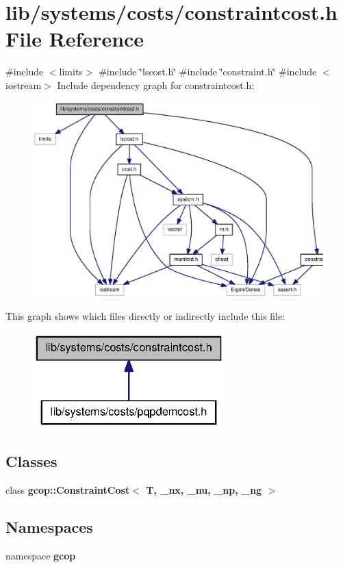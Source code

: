 \section{lib/systems/costs/constraintcost.h \-File \-Reference}
\label{constraintcost_8h}
{\ttfamily \#include $<$limits$>$}\*
{\ttfamily \#include \char`\"{}lscost.\-h\char`\"{}}\*
{\ttfamily \#include \char`\"{}constraint.\-h\char`\"{}}\*
{\ttfamily \#include $<$iostream$>$}\*
\-Include dependency graph for constraintcost.\-h\-:\nopagebreak
\begin{figure}[H]
\begin{center}
\leavevmode
\includegraphics[width=350pt]{constraintcost_8h__incl}
\end{center}
\end{figure}
\-This graph shows which files directly or indirectly include this file\-:\nopagebreak
\begin{figure}[H]
\begin{center}
\leavevmode
\includegraphics[width=210pt]{constraintcost_8h__dep__incl}
\end{center}
\end{figure}
\subsection*{\-Classes}
\begin{DoxyCompactItemize}
\item 
class {\bf gcop\-::\-Constraint\-Cost$<$ T, \-\_\-nx, \-\_\-nu, \-\_\-np, \-\_\-ng $>$}
\end{DoxyCompactItemize}
\subsection*{\-Namespaces}
\begin{DoxyCompactItemize}
\item 
namespace {\bf gcop}
\end{DoxyCompactItemize}
